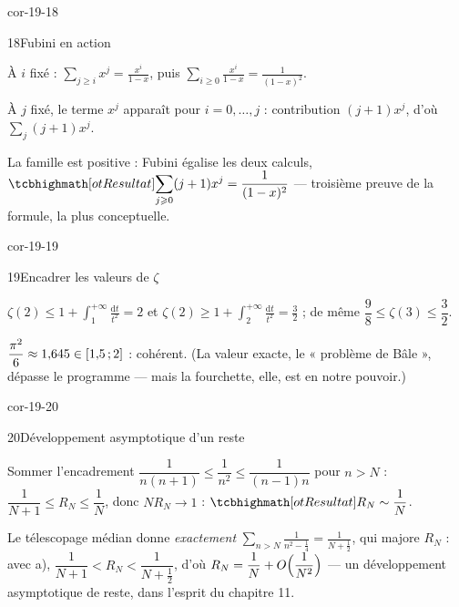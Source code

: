 \begin{blocLivre}{cor-19-18}
\begin{corrige}{18}{Fubini en action}
\begin{questions}
  \item À $i$ fixé :
    $\displaystyle\sum_{j\geqslant i}x^{j}=\frac{x^{i}}{1-x}$, puis
    $\displaystyle\sum_{i\geqslant0}\frac{x^{i}}{1-x}
    =\frac{1}{(1-x)^{2}}$.
  \item À $j$ fixé, le terme $x^{j}$ apparaît pour
    $i=0,\dots,j$ : contribution $(j+1)x^{j}$, d'où
    $\sum_j(j+1)x^{j}$.
\end{questions}
La famille est positive : Fubini égalise les deux calculs,
$\res{\displaystyle\sum_{j\geqslant0}(j+1)x^{j}=\frac{1}{(1-x)^{2}}}$ —
troisième preuve de la formule, la plus conceptuelle.
\end{corrige}
\end{blocLivre}

\begin{blocLivre}{cor-19-19}
\begin{corrige}{19}{Encadrer les valeurs de $\zeta$}
\begin{questions}
  \item $\zeta(2)\leqslant1+\displaystyle\int_{1}^{+\infty}
    \frac{\mathrm{d}t}{t^{2}}=2$ et
    $\zeta(2)\geqslant1+\displaystyle\int_{2}^{+\infty}
    \frac{\mathrm{d}t}{t^{2}}=\frac32$ ; de même
    $\dfrac98\leqslant\zeta(3)\leqslant\dfrac32$.
  \item $\dfrac{\pi^{2}}{6}\approx1{,}645\in\mathopen{[}1{,}5\,{;}\,2\mathclose{]}$ :
    cohérent. (La valeur exacte, le « problème de Bâle », dépasse le
    programme — mais la fourchette, elle, est en notre pouvoir.)
\end{questions}
\end{corrige}
\end{blocLivre}

\begin{blocLivre}{cor-19-20}
\begin{corrige}{20}{Développement asymptotique d'un reste}
\begin{questions}
  \item Sommer l'encadrement
    $\dfrac{1}{n(n+1)}\leqslant\dfrac{1}{n^{2}}\leqslant\dfrac{1}{(n-1)n}$
    pour $n>N$ : $\dfrac{1}{N+1}\leqslant R_N\leqslant\dfrac1N$, donc
    $NR_N\to1$ : $\res{R_N\sim\dfrac1N}$.
  \item Le télescopage médian donne \emph{exactement}
    $\displaystyle\sum_{n>N}\frac{1}{n^{2}-\frac14}=\frac{1}{N+\frac12}$,
    qui majore $R_N$ : avec a),
    $\dfrac{1}{N+1}<R_N<\dfrac{1}{N+\frac12}$, d'où
    $R_N=\dfrac1N+O\Bigl(\dfrac{1}{N^{2}}\Bigr)$ — un développement
    asymptotique de reste, dans l'esprit du chapitre 11.
\end{questions}
\end{corrige}
\end{blocLivre}


